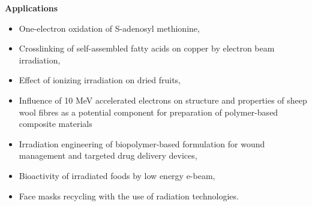 \textbf{Applications}


\begin{itemize}
\item One-electron oxidation of S-adenosyl methionine,
\item Crosslinking of self-assembled fatty acids on copper by electron beam irradiation,
\item Effect of ionizing irradiation on dried fruits,
\item Influence of 10 MeV accelerated electrons on structure and properties of sheep wool fibres as a potential component for preparation of polymer-based composite materials
\item Irradiation engineering of biopolymer-based formulation for wound management and targeted drug delivery devices,
\item Bioactivity of irradiated foods by low energy e-beam,
\item Face masks recycling with the use of radiation technologies.
\end{itemize}